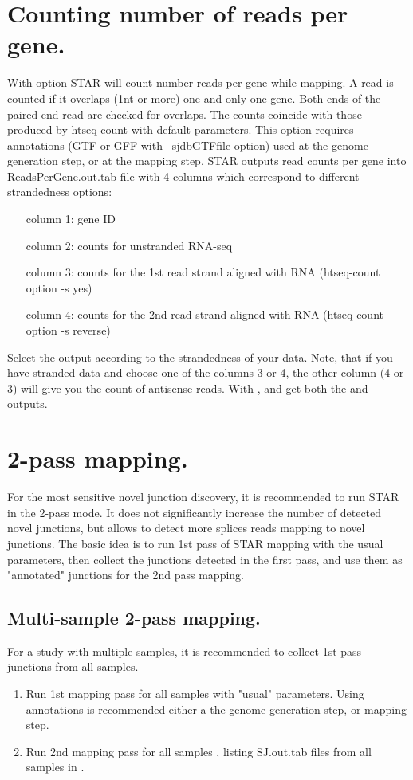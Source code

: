 \documentclass[12pt]{article}
\begin{document}
\section{Counting number of reads per gene.}
With   option STAR will count number reads per gene while mapping. 
A read is counted if it overlaps (1nt or more) one and only one gene. Both ends of the paired-end read are checked for overlaps. 
The counts coincide with those produced by htseq-count with default parameters.
This option requires annotations (GTF or GFF with --sjdbGTFfile option) used at the genome generation step, or at the mapping step.
STAR outputs read counts per gene into ReadsPerGene.out.tab file with 4 columns which correspond to different strandedness options:
\begin{itemize}[leftmargin=1in]
\item[column 1:] gene ID
\item[column 2:] counts for unstranded RNA-seq
\item[column 3:] counts for the 1st read strand aligned with RNA (htseq-count option -s yes)
\item[column 4:] counts for the 2nd read strand aligned with RNA (htseq-count option -s reverse)
\end{itemize}
Select the output according to the strandedness of your data.
Note, that if you have stranded data and choose one of the columns 3 or 4, the other column (4 or 3) will give you the count of antisense reads.
With   , and get both the  and  outputs.


\section{2-pass mapping.}

For the most sensitive novel junction discovery, it is recommended to run STAR in the 2-pass mode. It does not significantly increase the number of detected novel junctions, but allows to detect more splices reads mapping to novel junctions. The basic idea is to run 1st pass of STAR mapping with the usual parameters, then collect the junctions detected in the first pass, and use them as "annotated" junctions for the 2nd pass mapping.

\subsection{Multi-sample 2-pass mapping.}
For a study with multiple samples, it is recommended to collect 1st pass junctions from all samples.
\begin{enumerate}
\item Run 1st mapping pass for all samples with "usual" parameters. Using annotations is recommended either a the genome generation step, or mapping step.
\item Run 2nd mapping pass for all samples , listing SJ.out.tab files from all samples in  .
\end{enumerate}
\end{document}
